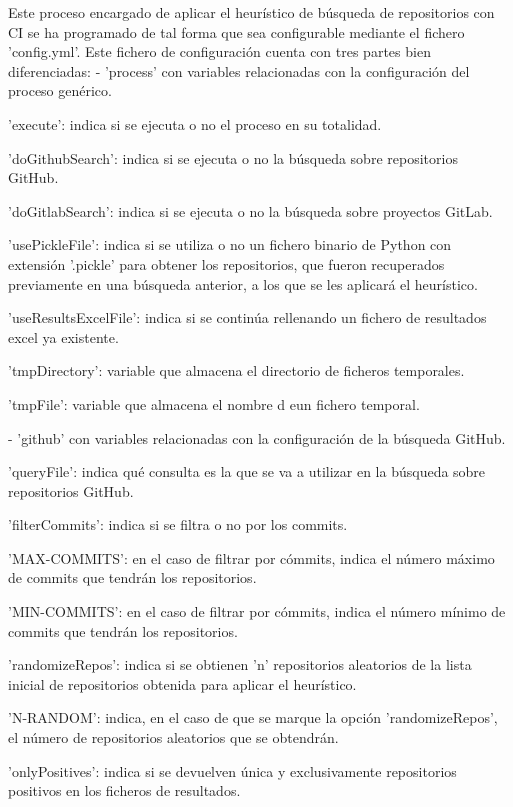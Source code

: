 Este proceso encargado de aplicar el heurístico de búsqueda de repositorios con CI se ha programado de tal forma que sea configurable mediante el fichero 'config.yml'. Este fichero de configuración cuenta con tres partes bien diferenciadas:
- 'process' con variables relacionadas con la configuración del proceso genérico.
\begin{compactitem}
    \item 'execute': indica si se ejecuta o no el proceso en su totalidad.
    \item 'doGithubSearch': indica si se ejecuta o no la búsqueda sobre repositorios GitHub.
    \item 'doGitlabSearch': indica si se ejecuta o no la búsqueda sobre proyectos GitLab.
    \item 'usePickleFile': indica si se utiliza o no un fichero binario de Python con extensión '.pickle' para obtener los repositorios, que fueron recuperados previamente en una búsqueda anterior, a los que se les aplicará el heurístico.
    \item 'useResultsExcelFile': indica si se continúa rellenando un fichero de resultados excel ya existente.
    \item 'tmpDirectory': variable que almacena el directorio de ficheros temporales.
    \item 'tmpFile': variable que almacena el nombre d eun fichero temporal.
\end{compactitem}
- 'github' con variables relacionadas con la configuración de la búsqueda GitHub.
\begin{compactitem}
    \item 'queryFile': indica qué consulta es la que se va a utilizar en la búsqueda sobre repositorios GitHub.
    \item 'filterCommits': indica si se filtra o no por los commits.
    \item 'MAX-COMMITS': en el caso de filtrar por cómmits, indica el número máximo de commits que tendrán los repositorios.
    \item 'MIN-COMMITS': en el caso de filtrar por cómmits, indica el número mínimo de commits que tendrán los repositorios.
    \item 'randomizeRepos': indica si se obtienen 'n' repositorios aleatorios de la lista inicial de repositorios obtenida para aplicar el heurístico.
    \item 'N-RANDOM': indica, en el caso de que se marque la opción 'randomizeRepos', el número de repositorios aleatorios que se obtendrán.
    \item 'onlyPositives': indica si se devuelven única y exclusivamente repositorios positivos en los ficheros de resultados.
\end{compactitem}
